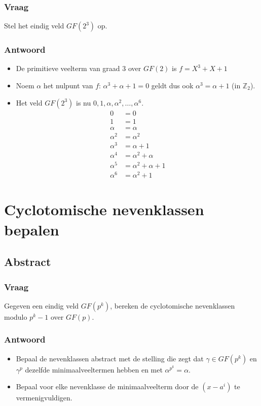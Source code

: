 \documentclass[main.tex]{subfiles}
\begin{document}
\subsubsection*{Vraag}
Stel het eindig veld $GF(2^{3})$ op.

\subsubsection*{Antwoord}
\begin{itemize}
\item De primitieve veelterm van graad $3$ over $GF(2)$ is $f=X^{3}+X+1$
\item Noem $\alpha$ het nulpunt van $f$: $\alpha^{3} + \alpha + 1=0$ geldt dus ook $\alpha^{3} = \alpha + 1$ (in $\mathbb{Z}_{2}$).
\item Het veld $GF(2^{3})$ is nu $0,1,\alpha,\alpha^{2},\dotsc,\alpha^{6}$.
  \[
  \begin{array}{rl}
    0 &= 0\\
    1 &= 1\\
    \alpha &= \alpha\\
    \alpha^{2} &= \alpha^{2}\\
    \alpha^{3} &= \alpha + 1\\
    \alpha^{4} &= \alpha^{2} + \alpha\\
    \alpha^{5} &= \alpha^{2} + \alpha + 1\\
    \alpha^{6} &= \alpha^{2} + 1
  \end{array}
  \]
\end{itemize}

\newpage
\section{Cyclotomische nevenklassen bepalen}
\subsection*{Abstract}
\subsubsection*{Vraag}
Gegeven een eindig veld $GF(p^{k})$, bereken de cyclotomische nevenklassen modulo $p^{k}-1$ over $GF(p)$.
\subsubsection*{Antwoord}
\begin{itemize}
\item Bepaal de nevenklassen abstract met de stelling die zegt dat $\gamma\in GF(p^{k})$ en $\gamma^{p}$ dezelfde minimaalveeltermen hebben en met $\alpha^{p^{k}} = \alpha$.
\item Bepaal voor elke nevenklasse de minimaalveelterm door de $(x-a^{i})$ te vermenigvuldigen.
\end{itemize}
\end{document}
